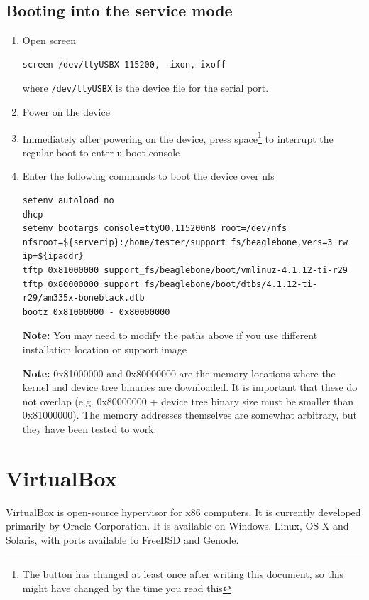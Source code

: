 \documentclass[a4paper,11pt]{article}
\newcommand{\note}{\textbf{Note: }}
\newcommand{\cmd}[1]{\texttt{#1}}
\begin{document}
\subsection{Booting into the service mode}
\label{bbbboot}

\begin{enumerate}
\item Open screen

\begin{lstlisting}
screen /dev/ttyUSBX 115200, -ixon,-ixoff
\end{lstlisting}
where \cmd{/dev/ttyUSBX} is the device file for the serial port.

\item Power on the device

\item Immediately after powering on the device, press space\footnote{The button has changed at least once after writing this document, so this might have changed by the time you read this} to interrupt the regular boot to enter u-boot console

\item Enter the following commands to boot the device over nfs

\begin{lstlisting}
setenv autoload no
dhcp
setenv bootargs console=ttyO0,115200n8 root=/dev/nfs nfsroot=${serverip}:/home/tester/support_fs/beaglebone,vers=3 rw ip=${ipaddr}
tftp 0x81000000 support_fs/beaglebone/boot/vmlinuz-4.1.12-ti-r29
tftp 0x80000000 support_fs/beaglebone/boot/dtbs/4.1.12-ti-r29/am335x-boneblack.dtb
bootz 0x81000000 - 0x80000000
\end{lstlisting}

\note You may need to modify the paths above if you use different installation location or support image

\note 0x81000000 and 0x80000000 are the memory locations where the kernel and device tree binaries are downloaded. It is important that these do not overlap (e.g. 0x80000000 + device tree binary size must be smaller than 0x81000000). The memory addresses themselves are somewhat arbitrary, but they have been tested to work.

\end{enumerate}

\section{VirtualBox}

VirtualBox is open-source hypervisor for x86 computers. It is currently developed primarily by Oracle Corporation. It is available on Windows, Linux, OS X and Solaris, with ports available to FreeBSD and Genode.
\end{document}
